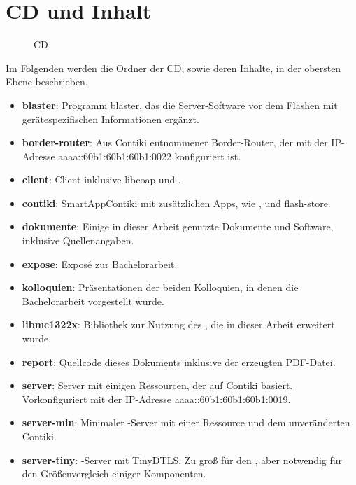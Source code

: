 \chapter{CD und Inhalt}

\begin{figure}[!ht]
\centering
{}
\caption{CD}
\label{tbl:a-cd}
\end{figure}

\clearpage

Im Folgenden werden die Ordner der CD, sowie deren Inhalte, in der obersten Ebene beschrieben. \newline

\begin{itemize}
  \setlength{\itemsep}{0.5cm}
  \item \textbf{blaster}: Programm blaster, das die Server-Software vor dem Flashen mit \newline gerätespezifischen Informationen ergänzt.
  \item \textbf{border-router}: Aus Contiki entnommener Border-Router, der mit der \newline IP-Adresse aaaa::60b1:60b1:60b1:0022 konfiguriert ist.
  \item \textbf{client}: Client inklusive libcoap und .
  \item \textbf{contiki}: SmartAppContiki mit zusätzlichen Apps, wie ,  und flash-store.
  \item \textbf{dokumente}: Einige in dieser Arbeit genutzte Dokumente und Software, inklusive Quellenangaben.
  \item \textbf{expose}: Exposé zur Bachelorarbeit.
  \item \textbf{kolloquien}: Präsentationen der beiden Kolloquien, in denen die Bachelorarbeit vorgestellt wurde.
  \item \textbf{libmc1322x}: Bibliothek zur Nutzung des , die in dieser Arbeit erweitert wurde.
  \item \textbf{report}: Quellcode dieses Dokuments inklusive der erzeugten PDF-Datei.
  \item \textbf{server}: Server mit einigen Ressourcen, der auf Contiki basiert. \newline Vorkonfiguriert mit der IP-Adresse aaaa::60b1:60b1:60b1:0019.
  \item \textbf{server-min}: Minimaler -Server mit einer Ressource und dem unveränderten Contiki.
  \item \textbf{server-tiny}: -Server mit TinyDTLS. Zu groß für den , \newline aber notwendig für den Größenvergleich einiger Komponenten.

\end{itemize}

